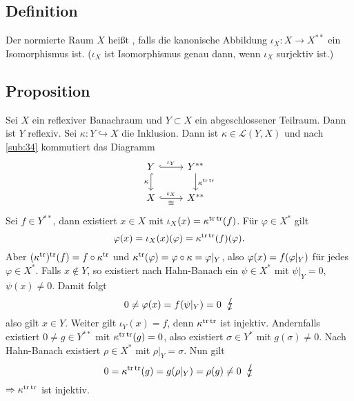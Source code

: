 
\subsection[Definition: Reflexiver normierter Raum]{Definition} %
\label{sub:513}
Der normierte Raum $X$ heißt , falls die kanonische Abbildung $\iota_X : X \to X^{**}$ ein Isomorphismus ist. 
($\iota_X$ ist Isomorphismus genau dann, wenn $\iota_X$ surjektiv ist.)

\subsection[Proposition: Abgeschlossene Unterräume von reflexiven Banachräumen sind reflexiv]{Proposition} %
\label{sub:514}
Sei $X$ ein reflexiver Banachraum und $Y \subset X$ ein abgeschlossener Teilraum. Dann ist $Y$ reflexiv.
Sei $\kappa : Y \hookrightarrow X$ die Inklusion. Dann ist $\kappa \in \mathcal{L}(Y,X)$ und nach \ref{sub:34} kommutiert das Diagramm
\[
	\begin{tikzcd}
		Y \rar[hook, "\iota_Y"] \dar["\kappa"', hook]& Y^{**}  \dar["\kappa^{\tr \,\tr}"] \\
		X \rar["\iota_X","\cong"', hook] & X^{**}
	\end{tikzcd}
\]
Sei $f\in Y^{**}$, dann existiert $x \in X$ mit $\iota_X(x)=\kappa^{\mathrm{tr}\,\mathrm{tr}}(f)$. Für $\varphi \in X^*$ gilt 
\[
	\varphi(x)=\iota_X(x)(\varphi)=\kappa^{\mathrm{tr}\,\mathrm{tr}}(f)(\varphi).
\]
Aber $(\kappa^{\mathrm{tr}})^{\mathrm{tr}} (f) = f \circ \kappa^{\mathrm{tr}}$ und $\kappa^{\mathrm{tr}}(\varphi) = \varphi \circ \kappa = \varphi|_{Y}$, also $\varphi(x)= f \enbrace*{\varphi|_Y}$ für jedes 
$\varphi \in X^*$. Falls $x \not\in Y$, so existiert nach Hahn-Banach ein $\psi \in X^*$ mit $\psi|_{Y}=0$, $\psi(x)\not= 0$. Damit folgt 
\[
	0 \not= \varphi(x) = f \enbrace*{\psi|_{Y}}=0 \enspace\light
\]
also gilt $x \in Y$. Weiter gilt $\iota_Y(x)=f$, denn $\kappa^{\mathrm{tr}\,\mathrm{tr}}$ ist injektiv. Andernfalls existiert $0 \not= g \in Y^{**}$ mit $\kappa^{\mathrm{tr}\,\mathrm{tr}}(g)=0$, also
existiert $\sigma \in Y^*$ mit $g(\sigma) \not= 0$. Nach Hahn-Banach existiert $\rho \in X^*$ mit $\rho|_{Y}=\sigma$. Nun gilt 
\[
	0 = \kappa^{\tr\,\tr}(g) = g \enbrace*{\rho|_Y} = \rho(g) \not= 0 \enspace \light 
\]
$\Rightarrow \kappa^{\mathrm{tr}\,\mathrm{tr}}$ ist injektiv. \bewende

